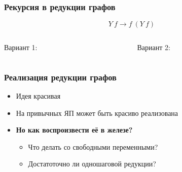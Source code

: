 \documentclass[aspectratio=169]{beamer}
\begin{document}
\begin{frame}
    \frametitle{Рекурсия в редукции графов}

    \[Y \ f \rightarrow f\ (Y\ f) \]
    \begin{columns}[T]
        \begin{column}{0.5\textwidth}
            Вариант 1:
            \begin{figure}
            \end{figure}
        \end{column}
        \begin{column}[T]{0.5\textwidth}
            Вариант 2:
            \begin{figure}
            \end{figure}
        \end{column}
    \end{columns}
\end{frame}

\begin{frame}
    \frametitle{Реализация редукции графов}

    \begin{itemize}
        \item Идея красивая
        \item<+-> На привычных ЯП может быть красиво реализована
        \item<+-| alert@+> \textbf{Но как воспроизвести её в железе?}
            \begin{itemize}
                \item Что делать со свободными переменными?
                \item Достатоточно ли одношаговой редукции?
            \end{itemize}
    \end{itemize}
\end{frame}
\end{document}
